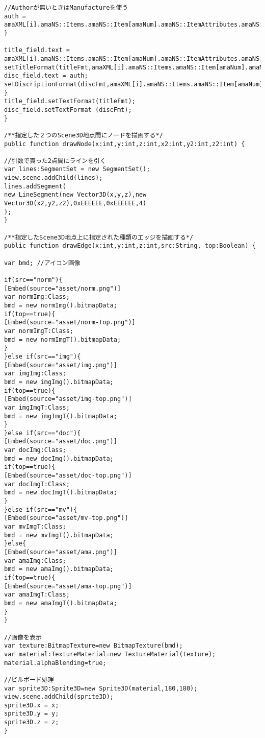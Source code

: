 {\begin{verbatim}
//Authorが無いときはManufactureを使う
auth = 
amaXML[i].amaNS::Items.amaNS::Item[amaNum].amaNS::ItemAttributes.amaNS::Manufacturer[0].toString();
}

title_field.text = 
amaXML[i].amaNS::Items.amaNS::Item[amaNum].amaNS::ItemAttributes.amaNS::Title.toString();
setTitleFormat(titleFmt,amaXML[i].amaNS::Items.amaNS::Item[amaNum].amaNS::DetailPageURL);
disc_field.text = auth;
setDiscriptionFormat(discFmt,amaXML[i].amaNS::Items.amaNS::Item[amaNum].amaNS::DetailPageURL);
}
title_field.setTextFormat(titleFmt);
disc_field.setTextFormat (discFmt);
}

/**指定した２つのScene3D地点間にノードを描画する*/
public function drawNode(x:int,y:int,z:int,x2:int,y2:int,z2:int) {

//引数で貰った2点間にラインを引く
var lines:SegmentSet = new SegmentSet();
view.scene.addChild(lines);
lines.addSegment(
new LineSegment(new Vector3D(x,y,z),new Vector3D(x2,y2,z2),0xEEEEEE,0xEEEEEE,4)
);
}

/**指定したScene3D地点上に指定された種類のエッジを描画する*/
public function drawEdge(x:int,y:int,z:int,src:String, top:Boolean) {

var bmd; //アイコン画像

if(src=="norm"){
[Embed(source="asset/norm.png")]
var normImg:Class;
bmd = new normImg().bitmapData;
if(top==true){
[Embed(source="asset/norm-top.png")]
var normImgT:Class;
bmd = new normImgT().bitmapData;
}
}else if(src=="img"){
[Embed(source="asset/img.png")]
var imgImg:Class;
bmd = new imgImg().bitmapData;
if(top==true){
[Embed(source="asset/img-top.png")]
var imgImgT:Class;
bmd = new imgImgT().bitmapData;
}
}else if(src=="doc"){
[Embed(source="asset/doc.png")]
var docImg:Class;
bmd = new docImg().bitmapData;
if(top==true){
[Embed(source="asset/doc-top.png")]
var docImgT:Class;
bmd = new docImgT().bitmapData;
}
}else if(src=="mv"){
[Embed(source="asset/mv-top.png")]
var mvImgT:Class;
bmd = new mvImgT().bitmapData;
}else{
[Embed(source="asset/ama.png")]
var amaImg:Class;
bmd = new amaImg().bitmapData;
if(top==true){
[Embed(source="asset/ama-top.png")]
var amaImgT:Class;
bmd = new amaImgT().bitmapData;
}
}

//画像を表示
var texture:BitmapTexture=new BitmapTexture(bmd);
var material:TextureMaterial=new TextureMaterial(texture);
material.alphaBlending=true;

//ビルボード処理
var sprite3D:Sprite3D=new Sprite3D(material,180,180);
view.scene.addChild(sprite3D);
sprite3D.x = x;
sprite3D.y = y;
sprite3D.z = z;
}


\end{verbatim}}
